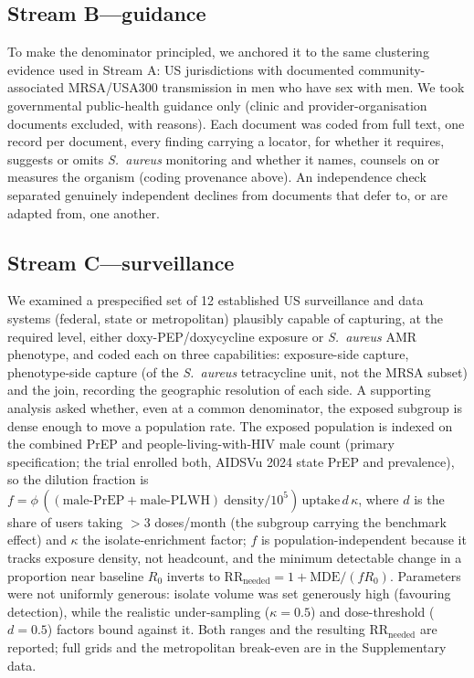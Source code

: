 \documentclass[12pt,a4paper]{article}
\newcommand{\sa}{\emph{S.~aureus}}
\begin{document}
\subsection*{Stream B---guidance}
To make the denominator principled, we anchored it to the same clustering
evidence used in Stream A: US jurisdictions with documented community-associated
MRSA/USA300 transmission in men who have sex with men.\cite{dejong2025,diep2008}
We took governmental public-health guidance only (clinic and
provider-organisation documents excluded, with reasons). Each document was coded
from full text, one record per document, every finding carrying a locator, for
whether it requires, suggests or omits \sa{} monitoring and whether it names,
counsels on or measures the organism (coding provenance above). An independence
check separated genuinely independent declines from documents that defer to, or
are adapted from, one another.

\subsection*{Stream C---surveillance}
We examined a prespecified set of 12 established US surveillance and data systems
(federal, state or metropolitan) plausibly capable of capturing, at the required
level, either doxy-PEP/doxycycline exposure or \sa{} AMR phenotype, and coded each
on three capabilities: exposure-side capture,
phenotype-side capture (of the \sa{} tetracycline unit, not the MRSA subset) and
the join, recording the geographic resolution of each side. A supporting analysis
asked whether, even at a common denominator, the exposed subgroup is dense enough
to move a population rate. The exposed population is indexed on the combined PrEP
and people-living-with-HIV male count (primary specification; the trial enrolled
both, AIDSVu 2024 state PrEP and prevalence), so the dilution fraction is
$f=\phi\,((\text{male-PrEP}+\text{male-PLWH})\ \text{density}/10^{5})\,\text{uptake}\,d\,\kappa$,
where $d$ is the share of users taking $>$3 doses/month (the subgroup carrying the
benchmark effect) and $\kappa$ the isolate-enrichment factor; $f$ is
population-independent
because it tracks exposure density, not headcount, and the minimum detectable
change in a proportion near baseline $R_0$ inverts to
$\mathrm{RR_{needed}}=1+\mathrm{MDE}/(f R_0)$. Parameters were not uniformly
generous: isolate volume was set generously high (favouring detection), while the
realistic under-sampling ($\kappa=0.5$) and dose-threshold ($d=0.5$) factors bound
against it. Both ranges and the resulting $\mathrm{RR_{needed}}$ are reported;
full grids and the metropolitan break-even are in the Supplementary data.
\end{document}
